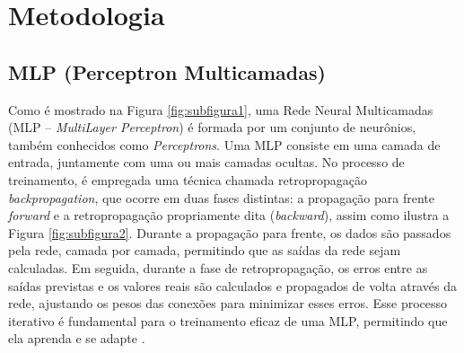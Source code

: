 \chapter{Metodologia}
\label{chap:metodologia}

\section{MLP (Perceptron Multicamadas)}

Como é mostrado na Figura \ref{fig:subfigura1}, uma Rede Neural Multicamadas (MLP – \textit{MultiLayer Perceptron})
é formada por um conjunto de neurônios, também conhecidos como
\textit{Perceptrons}. Uma MLP consiste em uma camada de entrada, juntamente com uma ou mais camadas ocultas.
No processo de treinamento, é empregada uma técnica chamada retropropagação \textit{backpropagation}, que
ocorre em duas fases distintas: a propagação para frente \textit{forward} e a retropropagação propriamente
dita (\textit{backward}), assim como ilustra a Figura \ref{fig:subfigura2}. Durante a propagação para frente, os dados são passados pela rede, camada por camada,
permitindo que as saídas da rede sejam calculadas. Em seguida, durante a fase de retropropagação, os
erros entre as saídas previstas e os valores reais são calculados e propagados de volta através da rede,
ajustando os pesos das conexões para minimizar esses erros. Esse processo iterativo é fundamental para o
treinamento eficaz de uma MLP, permitindo que ela aprenda e se adapte \cite{su12114776}.  

